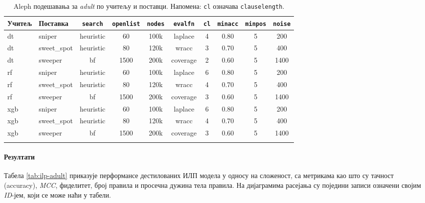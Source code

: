 \begin{table}[H]
\centering
\small
\setlength{\tabcolsep}{3pt}
\begin{tabularx}{\textwidth}{@{} l l c c c c c c c c @{}}
\toprule
\textbf{Учитељ} & \textbf{Поставка} & \texttt{search} & \texttt{openlist} & \texttt{nodes} & \texttt{evalfn} & \texttt{cl} & \texttt{minacc} & \texttt{minpos} & \texttt{noise} \\
\midrule
dt  & sniper      & heuristic & 60   & 100k & laplace  & 4 & 0.80 & 5 & 200  \\
dt  & sweet\_spot & heuristic & 80   & 120k & wracc    & 3 & 0.70 & 5 & 400  \\
dt  & sweeper     & bf        & 1500 & 200k & coverage & 2 & 0.60 & 5 & 1400 \\
rf  & sniper      & heuristic & 60   & 100k & laplace  & 6 & 0.80 & 5 & 200  \\
rf  & sweet\_spot & heuristic & 80   & 120k & wracc    & 4 & 0.70 & 5 & 400  \\
rf  & sweeper     & bf        & 1500 & 200k & coverage & 3 & 0.60 & 5 & 1400 \\
xgb & sniper      & heuristic & 60   & 100k & laplace  & 6 & 0.80 & 5 & 200  \\
xgb & sweet\_spot & heuristic & 80   & 120k & wracc    & 4 & 0.70 & 5 & 400  \\
xgb & sweeper     & bf        & 1500 & 200k & coverage & 3 & 0.60 & 5 & 1400 \\
\bottomrule
\caption{Aleph подешавања за \textit{adult} по учитељу и поставци. Напомена: \texttt{cl} означава \texttt{clauselength}.}
\label{tab:aleph-adult}
\end{tabularx}
\end{table}

\paragraph{Резултати} Табела \ref{tab:ilp-adult} приказује перформансе дестилованих ИЛП модела у односу на сложеност, са метрикама као што су тачност (accuracy), \textit{MCC}, фиделитет, број правила и просечна дужина тела правила. На дијаграмима расејања су поједини записи означени својим \emph{ID}-јем, који се може наћи у табели.

